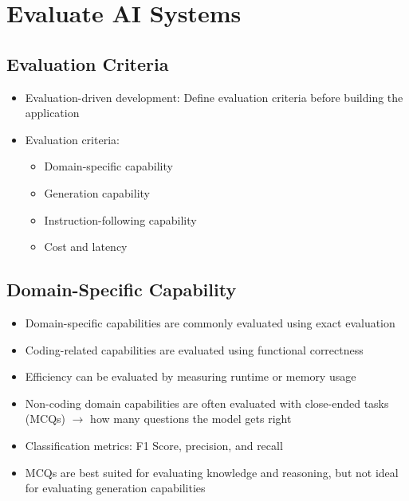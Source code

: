 \documentclass[11pt]{scrartcl}
\begin{document}
\section*{Evaluate AI Systems}
\subsection*{Evaluation Criteria}
\begin{itemize}
	\item Evaluation-driven development: Define evaluation criteria before building the application
	\item Evaluation criteria:
	\begin{itemize}
		\item Domain-specific capability
		\item Generation capability
		\item Instruction-following capability
		\item Cost and latency
	\end{itemize}
\end{itemize}

\subsection*{Domain-Specific Capability}
\begin{itemize}
	\item Domain-specific capabilities are commonly evaluated using exact evaluation
	\item Coding-related capabilities are evaluated using functional correctness
	\item Efficiency can be evaluated by measuring runtime or memory usage
	\item Non-coding domain capabilities are often evaluated with close-ended tasks (MCQs) $\to$ how many questions the model gets right
	\item Classification metrics: F1 Score, precision, and recall
	\item MCQs are best suited for evaluating knowledge and reasoning, but not ideal for evaluating generation capabilities
\end{itemize}
\end{document}
